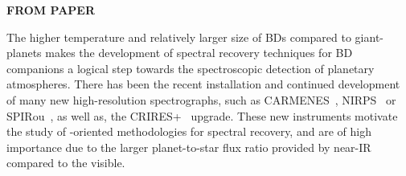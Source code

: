 \textbf{FROM PAPER}

The higher temperature and relatively larger size of BDs compared to giant-planets makes the development of spectral recovery techniques for BD companions a logical step towards the spectroscopic detection of planetary atmospheres.
There has been the recent installation and continued development of many new high-resolution \nir{} spectrographs, such as {CARMENES}~\citep{quirrenbach_carmenes_2014}, NIRPS~\citep{bouchy_nearinfrared_2017} or SPIRou~\citep{artigau_spirou_2014}, as well as, the {CRIRES+}~\citep{dorn_crires_2016} upgrade.
These new instruments motivate the study of \nir{}-oriented methodologies for spectral recovery, and are of high importance due to the larger planet-to-star flux ratio provided by near-IR compared to the visible.